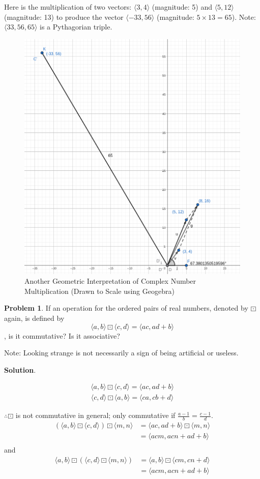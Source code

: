 \documentclass[english,notitlepage,smartquotes]{hgbreport}
\theoremstyle{definition}
\theoremstyle{definition}
\newtheorem{problem}{Problem}
\theoremstyle{remark}
\theoremstyle{definition}
\theoremstyle{plain}
\theoremstyle{definition}
\begin{document}
Here is the multiplication of two vectors: $\langle 3,4\rangle$ (magnitude: 5) and $\langle 5,12\rangle$ (magnitude: 13) to produce the vector $\langle -33,56\rangle$ (magnitude: $5\times13=65$). Note: $\langle 33,56,65\rangle$ is a Pythagorian triple.
\begin{figure}[h]
\begin{center}
\caption{Another Geometric Interpretation of Complex Number Multiplication (Drawn to Scale using Geogebra)}
\label{fig:complexmult2}
\includegraphics[width=.5\textwidth]{c1xc2-2} 
\end{center}
\end{figure}

\begin{problem}
\label{pr:affine}
If an operation for the ordered pairs of real numbers, denoted by $\boxdot$ again, is defined by
$$
\langle a,b\rangle\boxdot\langle c,d\rangle=\langle ac,ad+b\rangle
$$
, is it commutative? Is it associative?

Note: Looking strange is not necessarily a sign of being artificial or useless.
\end{problem}

\textbf{Solution}.

\begin{align*}
\langle a,b\rangle\boxdot\langle c,d\rangle=\langle ac,ad+b\rangle
\end{align*}
\begin{align*}
\langle c,d\rangle\boxdot\langle a,b\rangle=\langle ca,cb+d\rangle
\end{align*}

$\therefore \boxdot$ is not commutative in general; only commutative if $\frac{a-1}{b}=\frac{c-1}{d}$.
\begin{align*}
(\langle a,b\rangle\boxdot\langle c,d\rangle)\boxdot\langle m, n\rangle
&=\langle ac, ad+b\rangle\boxdot\langle m,n\rangle\\
&=\langle acm,acn+ad+b\rangle\\
\end{align*}
and
\begin{align*}
\langle a,b\rangle\boxdot(\langle c,d\rangle\boxdot\langle m, n\rangle)
&=\langle a,b\rangle\boxdot\langle cm,cn+d\rangle\\
&=\langle acm,acn+ad+b\rangle\\
\end{align*}
\end{document}
